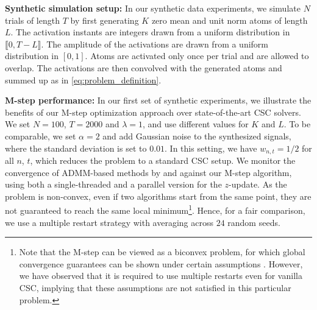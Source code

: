 


\textbf{Synthetic simulation setup:} 
In our synthetic data experiments, we simulate $N$ trials of length $T$ by first generating $K$ zero mean and unit norm atoms of length $L$. The  activation instants are integers drawn from a uniform distribution in $\llbracket0, T-L \rrbracket$. The amplitude of the activations are drawn from a uniform distribution in $[0, 1]$. Atoms are activated only once per trial and are allowed to overlap. The activations are then convolved with the generated atoms and summed up as in \eqref{eq:problem_definition}. 


\textbf{M-step performance:} 
In our first set of synthetic experiments, we illustrate the benefits of our M-step optimization approach over state-of-the-art CSC solvers. 
%
%
We set $N=100$, $T=2000$ and $\lambda=1$, and use different values for $K$ and $L$. To be comparable, we set $\alpha=2$ and add Gaussian noise to the synthesized signals, where the standard deviation is set to $0.01$. In this setting, we  have $w_{n,t}=1/2$ for all $n$, $t$, which reduces the problem to a standard CSC setup. We monitor the convergence of ADMM-based methods by \citet{heide2015fast} and \citet{wohlberg2016efficient} against our M-step algorithm, using both a single-threaded and a parallel version for the $z$-update. 
As the problem is non-convex, even if two algorithms start from the same point, they are not guaranteed to reach the same local minimum\footnote{Note that the M-step can be viewed as a biconvex problem, for which global convergence guarantees can be shown under certain assumptions \citep{agarwal2014learning, gorski2007biconvex}. However, we have observed that it is required to use multiple restarts even for vanilla CSC, implying that these assumptions are not satisfied in this particular problem.}. 
%
Hence, for a fair comparison, we use a multiple restart strategy with averaging across $24$ random seeds.




